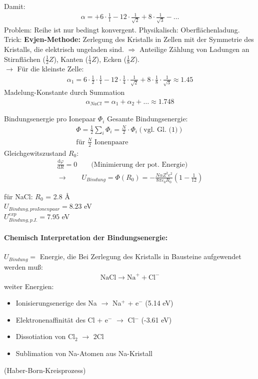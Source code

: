 	Damit:
	\begin{align}
		\alpha = +6 \cdot \frac{1}{1} - 12 \cdot \frac{1}{\sqrt{2}} + 8 \cdot \frac{1}{\sqrt{3}} - \dots
	\end{align}
	Problem: Reihe ist nur bedingt konvergent. Physikalisch: Oberflächenladung.\\
	Trick: \textbf{Evjen-Methode:} Zerlegung des Kristalls in Zellen mit der Symmetrie des Kristalls, die elektrisch ungeladen sind.
	$\Rightarrow$ Anteilige Zählung von Ladungen an Stirnflächen ($\frac{1}{2}Z$), Kanten ($\frac{1}{4}Z$), Ecken ($\frac{1}{8}Z$).\\
	$\rightarrow$ Für die kleinste Zelle:
	\begin{align}
		\alpha_1 = 6 \cdot \frac{1}{2} \cdot \frac{1}{1}  - 12 \cdot \frac{1}{4} \cdot \frac{1}{\sqrt{2}} + 8 \cdot \frac{1}{8} \cdot \frac{1}{\sqrt{3}} \approx 1.45
	\end{align}
	Madelung-Konstante durch Summation
	\begin{align*}
		\alpha_{NaCl} = \alpha_1 + \alpha_2 + \dots \approx 1.748
	\end{align*}

	Bindungsenergie pro Ionepaar $\Phi_i$
	Gesamte Bindungsenergie: 
	\begin{align} 
		\Phi = \frac{1}{2} \sum_i \Phi_i = \frac{N}{2} \cdot \Phi_i (\text{vgl. Gl. (1)})  \\
		\text{für }\frac{N}{2}\text{ Ionenpaare} \nonumber
	\end{align}
	Gleichgewitszustand $R_0$:
	\begin{align*}
		\frac{\mathrm{d} \varphi}{\mathrm{d} R} = 0 \qquad \text{(Minimierung der pot. Energie)} \\
		\rightarrow \qquad U_{Bindung} = \Phi (R_0) = - \frac{N \alpha Z^2 e^2}{8 \pi \varepsilon_0 R_0} \left(1- \frac{1}{12} \right)
	\end{align*}

	für NaCl: $R_0$ = 2.8 \AA\\
	$U_{Bindung, pro Ionenpaar} = 8.23$ eV\\
	$U_{Bindung,p.I.}^{exp} = 7.95$ eV \\

\paragraph{Chemisch Interpretation der Bindungsenergie:}
	$U_{Bindung} =$ Energie, die Bei Zerlegung des Kristalls in Bausteine aufgewendet werden muß:
	\begin{align*}
		\text{NaCl} \rightarrow \text{Na}^+ + \text{Cl}^-
	\end{align*}
	weiter Energien:
	\begin{itemize}
		\item Ionisierungsenerige des Na $\rightarrow$ Na$^+$ + e$^-$ (5.14 eV)
		\item Elektronenaffinität des Cl + e$^-$ $\rightarrow$ Cl$^-$ (-3.61 eV)
		\item Dissotiation von Cl$_2$ $\rightarrow$ 2Cl
		\item Sublimation von Na-Atomen aus Na-Kristall
	\end{itemize}
(Haber-Born-Kreisprozess)

